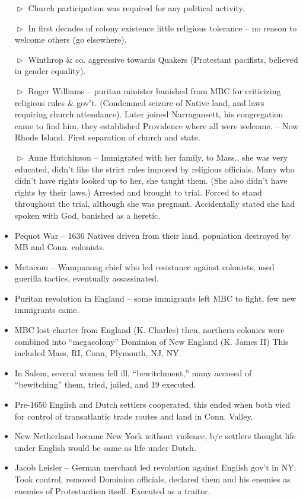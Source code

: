 \documentclass[10pt]{article}
\begin{document}
\begin{flushleft}
\begin{multicols}{2}
\begin{itemize}
 \item[$\vartriangleright$] Church participation was required for any political activity.
 \item[$\vartriangleright$] In first decades of colony existence little religious tolerance – no reason to welcome others (go elsewhere).
 \item[$\vartriangleright$] Winthrop \& co. aggressive towards Quakers (Protestant pacifists, believed in gender equality).
 \item[$\vartriangleright$] Roger Williams – puritan minister banished from MBC for criticizing religious rules \& gov’t. (Condemned seizure of Native land, and laws requiring church attendance). Later joined Narragansett, his congregation came to find him, they established Providence where all were welcome. – Now Rhode Island. First separation of church and state.
 \item[$\vartriangleright$] Anne Hutchinson – Immigrated with her family, to Mass., she was very educated, didn’t like the strict rules imposed by religious officials. Many who didn’t have rights looked up to her, she taught them. (She also didn’t have rights by their laws.) Arrested and brought to trial. Forced to stand throughout the trial, although she was pregnant. Accidentally stated she had spoken with God, banished as a heretic.
 \item Pequot War – 1636 Natives driven from their land, population destroyed by MB and Conn. colonists.
 \item Metacom – Wampanoag chief who led resistance against colonists, used guerilla tactics, eventually assassinated.
 \item Puritan revolution in England – some immigrants left MBC to fight, few new immigrants came.
 \item MBC lost charter from England (K. Charles) then, northern colonies were combined into “megacolony” Dominion of New England (K. James II) This included Mass, RI, Conn, Plymouth, NJ, NY.
 \item In Salem, several women fell ill, “bewitchment,” many accused of “bewitching” them, tried, jailed, and 19 executed.
 \item Pre-1650 English and Dutch settlers cooperated, this ended when both vied for control of transatlantic trade routes and land in Conn. Valley.
 \item New Netherland became New York without violence, b/c settlers thought life under English would be same as life under Dutch.
 \item Jacob Leisler – German merchant led revolution against English gov’t in NY. Took control, removed Dominion officials, declared them and his enemies as enemies of Protestantism itself. Executed as a traitor.

\end{itemize}
\end{multicols}
\end{flushleft}
\end{document}
